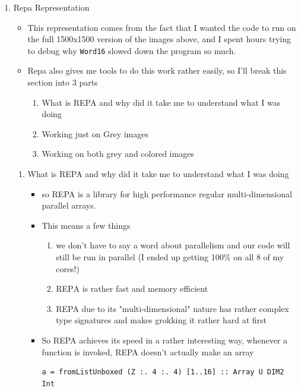 \documentclass{article}
\begin{document}
\begin{enumerate}
\begin{enumerate}
\begin{itemize}
\begin{itemize}
\begin{itemize}
\begin{itemize}
\begin{figure}
\begin{subfigure}
  \end{subfigure}
\end{figure}
\end{itemize}
\end{itemize}
\end{itemize}
\end{itemize}
\end{enumerate}
\item Repa Representation
\label{sec-2-2}
\begin{itemize}
\item This representation comes from the fact that I wanted the code to
run on the full 1500x1500 version of the images above, and I spent
hours trying to debug why \texttt{Word16} slowed down the program so much.
\item Repa also gives me tools to do this work rather easily, so I'll
break this section into 3 parts
\begin{enumerate}
\item What is REPA and why did it take me to understand what Ι was doing
\item Working just on Grey images
\item Working on both grey and colored images
\end{enumerate}
\end{itemize}
\begin{enumerate}
\item What is REPA and why did it take me to understand what Ι was doing
\label{sec-2-2-1}
\begin{itemize}
\item so REPA is a library for high performance regular multi-dimensional
parallel arrays.
\item This means a few things
\begin{enumerate}
\item we don't have to say a word about parallelism and our code will
still be run in parallel (I ended up getting 100\% on all 8 of my cores!)
\item REPΑ is rather fast and memory efficient
\item REPA due to its "multi-dimensional" nature has rather complex
type signatures and makes grokking it rather hard at first
\end{enumerate}
\item So REPA achieves its speed in a rather interesting way, whenever
a function is invoked, REPA doesn't actually make an array
\begin{verbatim}
a = fromListUnboxed (Z :. 4 :. 4) [1..16] :: Array U DIM2 Int

\end{verbatim}
\end{itemize}
\end{enumerate}
\end{enumerate}
\end{document}
